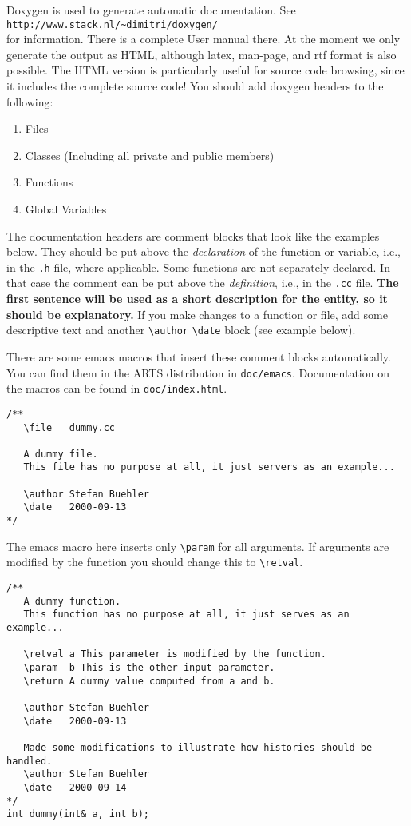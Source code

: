 Doxygen is used to generate automatic documentation. See\\
\verb|http://www.stack.nl/~dimitri/doxygen/|\\ for information. There
is a complete User manual there. At the moment we only generate the
output as HTML, although latex, man-page, and rtf format is also
possible. The HTML version is particularly useful for source code
browsing, since it includes the complete source code! You should add
doxygen headers to the following:

\begin{enumerate}
\item Files
\item Classes (Including all private and public members)
\item Functions
\item Global Variables
\end{enumerate}

The documentation headers are comment blocks that look like the
examples below. They should be put above the \emph{declaration} of the
function or variable, i.e., in the \verb|.h| file, where applicable.
Some functions are not separately declared. In that case the comment
can be put above the \emph{definition}, i.e., in the \verb|.cc| file.
\textbf{The first sentence will be used as a short description for the
  entity, so it should be explanatory.}  If you make changes to a
function or file, add some descriptive text and another \verb|\author|
\verb|\date| block (see example below).

There are some emacs macros that insert these comment blocks
automatically. You can find them in the ARTS distribution in
\verb|doc/emacs|. Documentation on the macros can be found in
\verb|doc/index.html|. 

\begin{verbatim}
/**
   \file   dummy.cc

   A dummy file.
   This file has no purpose at all, it just servers as an example... 
  
   \author Stefan Buehler
   \date   2000-09-13
*/    
\end{verbatim}


The emacs macro here inserts only \verb|\param| for all
arguments. If arguments are modified by the function you should
change this to \verb|\retval|.

\begin{verbatim}
/** 
   A dummy function.
   This function has no purpose at all, it just serves as an example...

   \retval a This parameter is modified by the function.
   \param  b This is the other input parameter.
   \return A dummy value computed from a and b.

   \author Stefan Buehler
   \date   2000-09-13

   Made some modifications to illustrate how histories should be handled.
   \author Stefan Buehler
   \date   2000-09-14
*/
int dummy(int& a, int b);
\end{verbatim}




